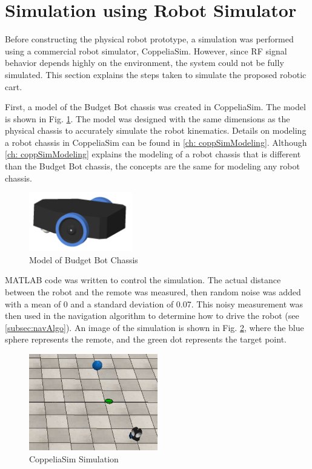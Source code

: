 \section{Simulation using Robot Simulator}

Before constructing the physical robot prototype, a simulation was performed using a commercial robot simulator, CoppeliaSim. However, since RF signal behavior depends highly on the environment, the system could not be fully simulated. This section explains the steps taken to simulate the proposed robotic cart.

\vspace*{12pt}
\noindent
First, a model of the Budget Bot chassis was created in CoppeliaSim. The model is shown in Fig. \ref{fig:budgetBotModel}. The model was designed with the same dimensions as the physical chassis to accurately simulate the robot kinematics. Details on modeling a robot chassis in CoppeliaSim can be found in \autoref{ch: coppSimModeling}. Although \autoref{ch: coppSimModeling} explains the modeling of a robot chassis that is different than the Budget Bot chassis, the concepts are the same for modeling any robot chassis.
\begin{figure}[H]
    \centering
    \includegraphics[width=0.4\textwidth]{figs/img/budgetBotModel.png}
    \caption{Model of Budget Bot Chassis}
    \label{fig:budgetBotModel}
\end{figure}

\noindent
MATLAB code was written to control the simulation. The actual distance between the robot and the remote was measured, then random noise was added with a mean of 0 and a standard deviation of 0.07. This noisy measurement was then used in the navigation algorithm to determine how to drive the robot (see \autoref{subsec:navAlgo}). An image of the simulation is shown in Fig. \ref{fig:coppSimExample}, where the blue sphere represents the remote, and the green dot represents the target point.
\begin{figure}[H]
    \centering
    \includegraphics[width=0.5\textwidth]{figs/img/coppSimExample.png}
    \caption{CoppeliaSim Simulation}
    \label{fig:coppSimExample}
\end{figure}


